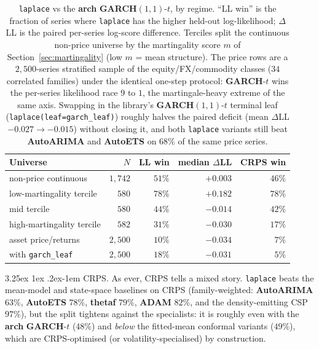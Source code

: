 \documentclass[article]{jss}
\makeatletter
\renewcommand\paragraph{\@startsection{paragraph}{4}{\z@}%
  {3.25ex \@plus1ex \@minus.2ex}{-1em}%
  {\normalfont\normalsize\itshape}}
\providecommand{\pkg}[1]{\textbf{#1}}
\providecommand{\code}[1]{\texttt{#1}}
\makeatother
\begin{document}
\begin{table}[t!]
\centering
\begin{tabular}{lrrrr}
\toprule
Universe & $N$ & LL win & median $\Delta$LL & CRPS win \\
\midrule
non-price continuous            & $1{,}742$ & $51\%$ & $+0.003$ & $46\%$ \\
\quad low-martingality tercile  & $580$     & $78\%$ & $+0.182$ & $78\%$ \\
\quad mid tercile               & $580$     & $44\%$ & $-0.014$ & $42\%$ \\
\quad high-martingality tercile & $582$     & $31\%$ & $-0.030$ & $17\%$ \\
asset price/returns             & $2{,}500$ & $10\%$ & $-0.034$ & $7\%$  \\
\quad with \code{garch\_leaf}   & $2{,}500$ & $18\%$ & $-0.031$ & $5\%$  \\
\bottomrule
\end{tabular}
\caption{\code{laplace} vs the \pkg{arch} \pkg{GARCH}$(1,1)$-$t$, by regime.
``LL win'' is the fraction of series where \code{laplace} has the higher
held-out log-likelihood; $\Delta$LL is the paired per-series log-score
difference. Terciles split the continuous non-price universe by the
martingality score $m$ of Section~\ref{sec:martingality} (low $m$ = mean
structure). The price rows are a $2{,}500$-series stratified sample of the
equity/FX/commodity classes ($34$ correlated families) under the identical
one-step protocol: \pkg{GARCH}-$t$ wins the per-series likelihood race $9$
to $1$, the martingale-heavy extreme of the same axis. Swapping in the
library's \pkg{GARCH}$(1,1)$-$t$ terminal leaf (\code{laplace(leaf=garch\_leaf)})
roughly halves the paired deficit (mean $\Delta$LL $-0.027 \to -0.015$) without
closing it, and both \code{laplace} variants still beat \pkg{AutoARIMA} and
\pkg{AutoETS} on $68\%$ of the same price series.}
\label{tab:price}
\end{table}

\paragraph{CRPS.}
As ever, CRPS tells a mixed story. \code{laplace} beats the mean-model and
state-space baselines on CRPS (family-weighted: \pkg{AutoARIMA} $63\%$,
\pkg{AutoETS} $78\%$, \pkg{thetaf} $79\%$, \pkg{ADAM} $82\%$, and the
density-emitting CSP $97\%$), but the split tightens against the specialists: it
is roughly even with the \pkg{arch} \pkg{GARCH}-$t$ ($48\%$) and \emph{below} the
fitted-mean conformal variants ($49\%$), which are CRPS-optimised (or
volatility-specialised) by construction.
\end{document}
